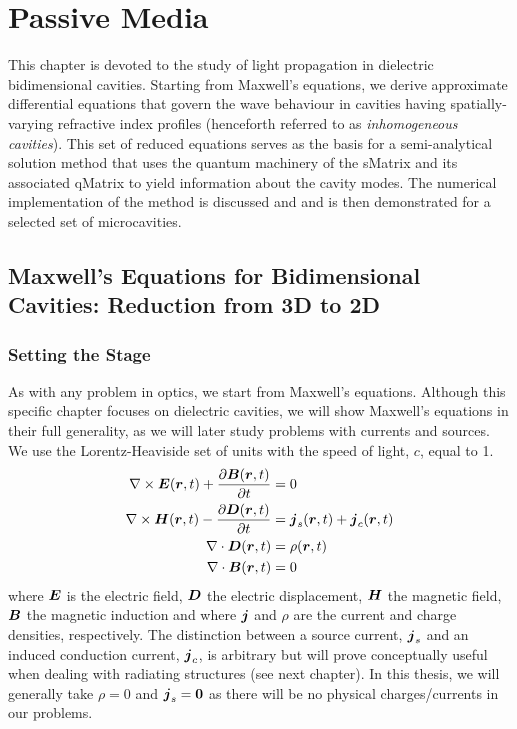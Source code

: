 \chapter{Passive Media}
This chapter is devoted to the study of light propagation in 
dielectric bidimensional cavities. Starting from Maxwell's equations, 
we derive approximate differential equations that govern 
the wave behaviour in cavities having spatially-varying 
refractive index profiles (henceforth referred to as 
\textit{inhomogeneous cavities}). This set of reduced equations
serves as the basis for a semi-analytical solution method 
that uses the quantum machinery of the \gls{sMatrix}
and its associated \gls{qMatrix} to yield information
about the cavity modes. The numerical implementation of the
method is discussed and and is then demonstrated for a selected
set of microcavities. 

\section{Maxwell's Equations for Bidimensional Cavities: Reduction from 3D to 2D}
\subsection{Setting the Stage}
As with any problem in optics, we start from Maxwell's equations. Although 
this specific chapter focuses on dielectric cavities, we will show Maxwell's equations
in their full generality, as we will later study problems with currents and sources. 
We use the Lorentz-Heaviside set of units with the speed of light, $c$, equal to 1. 
  \begin{subequations}
  \label{eq:passive.formalism.maxwellsEquations}
  \begin{align}
   \nabla\times\boldsymbol{E}(\boldsymbol{r},t)+\frac{\partial\boldsymbol{B}(\boldsymbol{r},t)}{\partial t}	&=0			\\
   \nabla\times\boldsymbol{H}(\boldsymbol{r},t)-\frac{\partial\boldsymbol{D}(\boldsymbol{r},t)}{\partial t}	&=\boldsymbol{j}_s(\boldsymbol{r},t)+\boldsymbol{j}_c(\boldsymbol{r},t)	\\
   \nabla\cdot\boldsymbol{D}(\boldsymbol{r},t)							&=\rho(\boldsymbol{r},t)			\\
   \nabla\cdot\boldsymbol{B}(\boldsymbol{r},t)							&=0
  \end{align}
  \end{subequations}
where $\boldsymbol{E}$ is the electric field, $\boldsymbol{D}$ the electric displacement, $\boldsymbol{H}$
the magnetic field, $\boldsymbol{B}$ the magnetic induction and where 
$\boldsymbol{j}$ and $\rho$ are the current and charge densities, respectively. 
The distinction between a source current, $\boldsymbol{j}_s$ and an induced conduction
current, $\boldsymbol{j}_c$, is arbitrary but will prove conceptually useful when dealing
with radiating structures (see next chapter).
In this thesis, we will generally take $\rho=0$ and $\boldsymbol{j}_s=\boldsymbol{0}$
as there will be no physical charges/currents in our problems.

